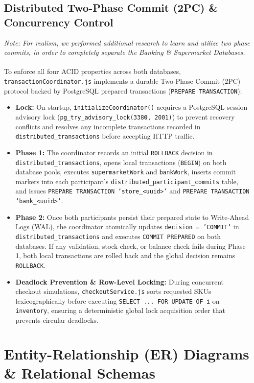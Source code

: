 \documentclass[11pt, a4paper]{article}
\begin{document}
\subsection{Distributed Two-Phase Commit (2PC) \& Concurrency Control}
\textit{Note: For realism, we performed additional research to learn and utilize two phase commits, in order to completely separate the Banking \& Supermarket Databases.} \\\\
To enforce all four ACID properties across both databases, \texttt{transactionCoordinator.js} implements a durable Two-Phase Commit (2PC) protocol backed by PostgreSQL prepared transactions (\texttt{PREPARE TRANSACTION}):

\begin{itemize}
    \item \textbf{Lock:} On startup, \texttt{initializeCoordinator()} acquires a PostgreSQL session advisory lock (\texttt{pg\_try\_advisory\_lock(3380, 2001)}) to prevent recovery conflicts and resolves any incomplete transactions recorded in \texttt{distributed\_transactions} before accepting HTTP traffic.
    \item \textbf{Phase 1:} The coordinator records an initial \texttt{ROLLBACK} decision in \texttt{distributed\_transactions}, opens local transactions (\texttt{BEGIN}) on both database pools, executes \texttt{supermarketWork} and \texttt{bankWork}, inserts commit markers into each participant's \texttt{distributed\_participant\_commits} table, and issues \texttt{PREPARE TRANSACTION 'store\_<uuid>'} and \texttt{PREPARE TRANSACTION 'bank\_<uuid>'}.
    \item \textbf{Phase 2:} Once both participants persist their prepared state to Write-Ahead Logs (WAL), the coordinator atomically updates \texttt{decision = 'COMMIT'} in \texttt{distributed\_transactions} and executes \texttt{COMMIT PREPARED} on both databases. If any validation, stock check, or balance check fails during Phase 1, both local transactions are rolled back and the global decision remains \texttt{ROLLBACK}.
    \item \textbf{Deadlock Prevention \& Row-Level Locking:} During concurrent checkout simulations, \texttt{checkoutService.js} sorts requested SKUs lexicographically before executing \texttt{SELECT ... FOR UPDATE OF i} on \texttt{inventory}, ensuring a deterministic global lock acquisition order that prevents circular deadlocks.
\end{itemize}

\section{Entity-Relationship (ER) Diagrams \& Relational Schemas}
\end{document}
